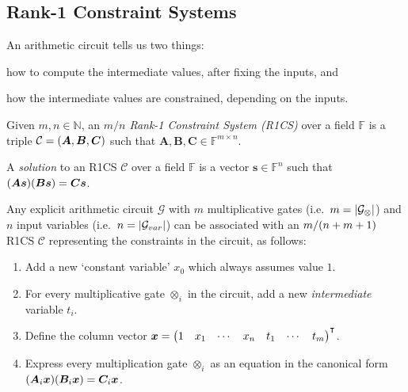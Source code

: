 \subsection{Rank-1 Constraint Systems}
An arithmetic circuit tells us two things:
\begin{enumerate*}[label=(\roman*)] %
  \item how to compute the intermediate values, after fixing the inputs, and
  \item  how the intermediate values are constrained, depending on the inputs.
\end{enumerate*}   
\begin{definition}
	Given \(m,n \in \mathbb{N}\), an \emph{\(m/n\) Rank-1 Constraint System (R1CS)} over a field 
	\(\mathbb{F}\) is a triple \(\mathcal{C} = \left(\bm{A}, \bm{B}, \bm{C}\right)\) such that 
  \(\bm{A}, \bm{B}, \bm{C} \in \mathbb{F}^{m \times n}\).
\end{definition}
\begin{definition}[R1CS solution]
  A \emph{solution} to an R1CS \(\mathcal{C}\) over a field \(\mathbb{F}\) is a vector 
  \(\bm{s} \in \mathbb{F}^n\) such that 
  \(\Parens*{\bm{A}\bm{s}}\Parens*{\bm{B}\bm{s}} = \bm{C}\bm{s}\).
\end{definition}
Any explicit arithmetic circuit \(\mathcal{G}\) with \(m\) multiplicative gates 
(i.e.\  \(m = \left\lvert\mathcal{G}_{\otimes}\right\rvert\)) and \(n\) input variables 
(i.e.\  \(n = \left\lvert\mathcal{G}_{var}\right\rvert\)) can be associated with an \({m}/\Parens*{n+m+1}\) 
R1CS \(\mathcal{C}\) representing the constraints in the circuit, as follows:
\begin{enumerate}
	\item Add a new `constant variable' \(x_0\) which always assumes value \(1\).
	\item For every multiplicative gate \(\otimes_i \) in the circuit, add a new \emph{intermediate}
	      variable \(t_i\). 
	\item Define the column vector
	      \(\bm{x} = {\begin{pmatrix}1 & x_1 & \cdots & x_n & t_1 & \cdots & t_m \end{pmatrix}}^\transpose \).
	\item Express every multiplication gate \(\otimes_i \) as an equation in the canonical form
	      \(\Parens*{\bm{A}_i\bm{x}}\Parens*{\bm{B}_i\bm{x}} = \bm{C}_i\bm{x}\).
\end{enumerate}

